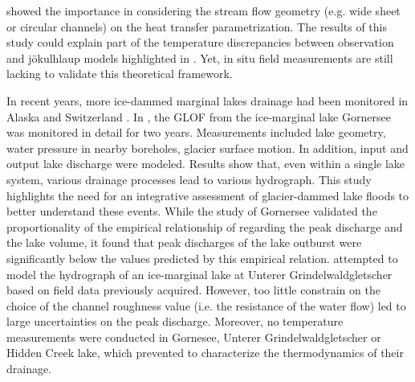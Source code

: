\cite{Sommers&Rajaram2020} showed the importance in considering the stream flow geometry (e.g. wide sheet or circular channels) on the heat transfer parametrization. The results of this study could explain part of the temperature discrepancies between observation and jökulhlaup models highlighted in \cite{Clarke2003,Flowers&al2004}. Yet, in situ field measurements are still lacking to validate this theoretical framework.   


In recent years, more ice-dammed marginal lakes drainage had been monitored in Alaska \citep[Hidden Creek Lake, ][]{Anderson&al2003,Anderson&al2005,Walder&al2005,Walder&al2006} and Switzerland \citep{Huss&al2007, Werder&al2010}. In \cite{Huss&al2007}, the GLOF from the ice-marginal lake Gornersee was monitored in detail for two years. Measurements included lake geometry, water pressure in nearby boreholes, glacier surface motion. In addition, input and output lake discharge were modeled. Results show that, even within a single lake system, various drainage processes lead to various hydrograph. This study highlights the need for an integrative assessment of glacier-dammed lake floods to better understand these events. While the study of Gornersee validated the proportionality of the empirical relationship of \cite{Clague&Mathews1973} regarding the peak discharge and the lake volume, it found that peak discharges of the lake outburst were significantly below the values predicted by this empirical relation. \cite{Werder&al2010} attempted to model the hydrograph of an ice-marginal lake at Unterer Grindelwaldgletscher based on field data previously acquired. However, too little constrain on the choice of the channel roughness value (i.e. the resistance of the water flow) led to large uncertainties on the peak discharge. Moreover, no temperature measurements were conducted in Gornesee, Unterer Grindelwaldgletscher or Hidden Creek lake, which prevented to characterize the thermodynamics of their drainage. 




